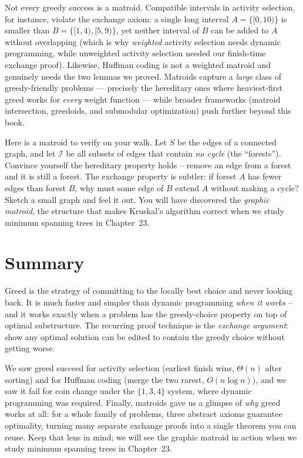 \begin{remark}
Not every greedy success is a matroid. Compatible intervals in activity
selection, for instance, violate the exchange axiom: a single long interval
$A = \{[0,10)\}$ is smaller than $B = \{[1,4), [5,9)\}$, yet neither interval of
$B$ can be added to $A$ without overlapping (which is why \emph{weighted}
activity selection needs dynamic programming, while unweighted activity selection
needed our finish-time exchange proof). Likewise, Huffman coding is not a
weighted matroid and genuinely needs the two lemmas we proved. Matroids capture a
\emph{large} class of greedy-friendly problems --- precisely the hereditary ones
where heaviest-first greed works for \emph{every} weight function --- while
broader frameworks (matroid intersection, greedoids, and submodular optimization)
push further beyond this book.
\end{remark}

\begin{walkbox}
Here is a matroid to verify on your walk. Let $S$ be the edges of a connected
graph, and let $\mathcal{I}$ be all subsets of edges that contain \emph{no cycle}
(the ``forests''). Convince yourself the hereditary property holds -- remove an
edge from a forest and it is still a forest. The exchange property is subtler:
if forest $A$ has fewer edges than forest $B$, why must some edge of $B$ extend
$A$ without making a cycle? Sketch a small graph and feel it out. You will have
discovered the \emph{graphic matroid}, the structure that makes Kruskal's
algorithm correct when we study minimum spanning trees in Chapter~23.
\end{walkbox}

\section{Summary}

Greed is the strategy of committing to the locally best choice and never looking
back. It is much faster and simpler than dynamic programming \emph{when
it works} -- and it works exactly when a problem has the greedy-choice property
on top of optimal substructure. The recurring proof technique is the
\emph{exchange argument}: show any optimal solution can be edited to contain the
greedy choice without getting worse.

We saw greed succeed for activity selection (earliest finish wins, $\Theta(n)$
after sorting) and for Huffman coding (merge the two rarest, $O(n \log n)$), and
we saw it fail for coin change under the $\{1,3,4\}$ system, where dynamic
programming was required. Finally, matroids gave us a glimpse of \emph{why} greed
works at all: for a whole family of problems, three abstract axioms guarantee
optimality, turning many separate exchange proofs into a single theorem you can
reuse. Keep that lens in mind; we will see the graphic matroid in action when we study minimum
spanning trees in Chapter~23.

